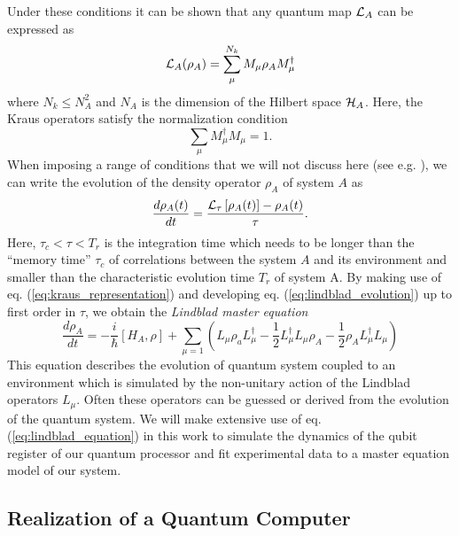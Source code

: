 Under these conditions it can be shown that any quantum map $\LA{A}$ can be expressed as \citep{kraus_states_1983}
%
\begin{equation}
\LA{A}(\rho_A) = \sum\limits_\mu^{N_k} M_\mu \rho_A M_\mu^\dagger \label{eq:kraus_representation}
\end{equation}
%
where $N_k \le N_A^2$ and $N_A$ is the dimension of the Hilbert space $\begin{mathcal}H\end{mathcal}_A$. Here, the Kraus operators satisfy the normalization condition
%
\begin{equation}
\sum\limits_\mu M_\mu^\dagger M_\mu = \mathrm{1}.
\end{equation}
%
When imposing a range of conditions that we will not discuss here (see e.g. \citep{haroche_exploring_2006}), we can write the evolution of the density operator $\rho_A$ of system $A$ as
%
\begin{equation}
\frac{d\rho_A(t)}{dt}=\frac{\LA{\tau}\left[\rho_A(t)\right]-\rho_A(t)}{\tau}. \label{eq:lindblad_evolution}
\end{equation}
%
Here, $\tau_c<\tau<T_r$ is the integration time which needs to be longer than the ``memory time'' $\tau_c$ of correlations between the system $A$ and its environment and smaller than the characteristic evolution time $T_r$ of system A. By making use of eq. (\ref{eq:kraus_representation}) and developing eq. (\ref{eq:lindblad_evolution}) up to first order in $\tau$, we obtain the {\it Lindblad master equation}
%
\begin{equation}
\frac{d\rho_A}{dt} = -\frac{i}{\hbar}[H_A,\rho]+\sum\limits_{\mu = 1}\left(L_\mu\rho_aL_\mu^\dagger-\frac{1}{2}L_\mu^\dagger L_\mu\rho_A-\frac{1}{2}\rho_A L_\mu^\dagger L_\mu\right) \label{eq:lindblad_equation}
\end{equation}
%
This equation describes the evolution of quantum system coupled to an environment which is simulated by the non-unitary action of the Lindblad operators $L_\mu$. Often these operators can be guessed or derived from the evolution of the quantum system. We will make extensive use of eq. (\ref{eq:lindblad_equation}) in this work to simulate the dynamics of the qubit register of our quantum processor and fit experimental data to a master equation model of our system.

\subsection{Realization of a Quantum Computer}

